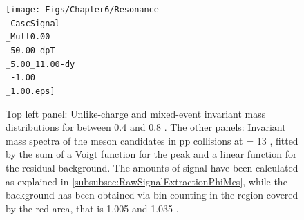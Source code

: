 {\begin{landscape}
\begin{figure}[p]
\begin{minipage}[t]{.3\textwidth}
    \end{minipage}
    \hfill
    \begin{minipage}[t]{.3\textwidth}
		\hspace*{-4.cm}
        \texttt{[image: Figs/Chapter6/Resonance\\\_CascSignal\\\_Mult0.00\\\_50.00-dpT\\\_5.00\_11.00-dy\\\_-1.00\\\_1.00.eps]}
    \end{minipage}  
\caption{Top left panel: Unlike-charge and mixed-event invariant mass distributions for \pT between 0.4 and 0.8 \gmom. The other panels: Invariant mass spectra of the \rmPhiMes meson candidates in pp collisions at \sqrtS = 13 \tev, fitted by the sum of a Voigt function for the peak and a linear function for the residual background. The amounts of signal have been calculated as explained in \Sec\ref{subsubsec:RawSignalExtractionPhiMes}, while the background has been obtained via bin counting in the region covered by the red area, that is 1.005 and 1.035 \gmass.}
	\label{fig:InvMassPhiResVsPt}
\end{figure}
\end{landscape}
}

